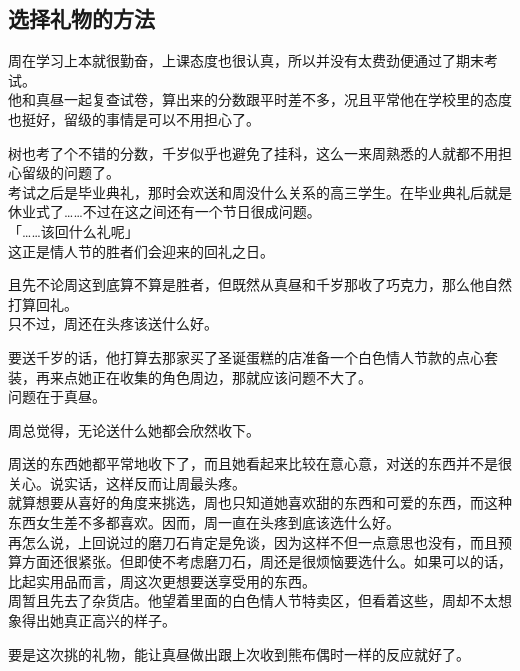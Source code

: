 \subsection{选择礼物的方法}

周在学习上本就很勤奋，上课态度也很认真，所以并没有太费劲便通过了期末考试。\\

他和真昼一起复查试卷，算出来的分数跟平时差不多，况且平常他在学校里的态度也挺好，留级的事情是可以不用担心了。

树也考了个不错的分数，千岁似乎也避免了挂科，这么一来周熟悉的人就都不用担心留级的问题了。\\

考试之后是毕业典礼，那时会欢送和周没什么关系的高三学生。在毕业典礼后就是休业式了……不过在这之间还有一个节日很成问题。\\

「……该回什么礼呢」\\

这正是情人节的胜者们会迎来的回礼之日。

且先不论周这到底算不算是胜者，但既然从真昼和千岁那收了巧克力，那么他自然打算回礼。\\

只不过，周还在头疼该送什么好。

要送千岁的话，他打算去那家买了圣诞蛋糕的店准备一个白色情人节款的点心套装，再来点她正在收集的角色周边，那就应该问题不大了。\\

问题在于真昼。

周总觉得，无论送什么她都会欣然收下。

周送的东西她都平常地收下了，而且她看起来比较在意心意，对送的东西并不是很关心。说实话，这样反而让周最头疼。\\

就算想要从喜好的角度来挑选，周也只知道她喜欢甜的东西和可爱的东西，而这种东西女生差不多都喜欢。因而，周一直在头疼到底该选什么好。\\

再怎么说，上回说过的磨刀石肯定是免谈，因为这样不但一点意思也没有，而且预算方面还很紧张。但即使不考虑磨刀石，周还是很烦恼要选什么。如果可以的话，比起实用品而言，周这次更想要送享受用的东西。\\

周暂且先去了杂货店。他望着里面的白色情人节特卖区，但看着这些，周却不太想象得出她真正高兴的样子。

要是这次挑的礼物，能让真昼做出跟上次收到熊布偶时一样的反应就好了。\\

